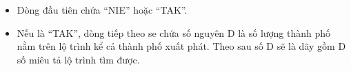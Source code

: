 \begin{itemize}
	\item Dòng đầu tiên chứa “NIE” hoặc “TAK”.
	\item Nếu là “TAK”, dòng tiếp theo se chứa số nguyên D là số lượng thành phố nằm trên lộ trình kể cả thành phố xuất phát. Theo sau số D sẽ là dãy gồm D số miêu tả lộ trình tìm được.
\end{itemize}